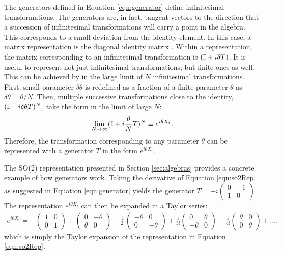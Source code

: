 The generators defined in Equation \ref{eqn:generator} define infinitesimal transformations.
The generators are, in fact, tangent vectors to the direction that a succession of infinitesimal transformations will carry a point in the algebra.
This corresponds to a small deviation from the identity element. In this case, a matrix representation is the diagonal identity matrix \ident.
Within a representation, the matrix corresponding to an infinitesimal transformation is $(\mathbb{I}+i\delta T)$.
It is useful to represent not just infinitesimal transformations, but finite ones as well.
This can be achieved by in the large limit of $N$ infinitesimal transformations.
First, small parameter $\delta\theta$ is redefined as a fraction of a finite parameter $\theta$ as $\delta\theta=\theta/N$.
Then, multiple successive transformations close to the identity, $(\mathbb{I}+i\delta\theta T)^N$, take the form in the limit of large $N$:
\begin{equation}\begin{split}
\lim_{N\to\infty}(\mathbb{I}+i\frac{\theta}{N}T)^N\equiv e^{i\theta X_i}. \\
\end{split}\end{equation}
Therefore, the transformation corresponding to any parameter $\theta$ can be represented with a generator $T$ in the form $e^{i\theta X_i}$.

The SO(2) representation presented in Section \ref{sec:algebras} provides a concrete example of how generators work.
Taking the derivative of Equation \ref{eqn:so2Rep} as suggested in Equation \ref{eqn:generator} yields the generator $T=-i\begin{pmatrix}0&-1\\1&0\end{pmatrix}$.
The representation $e^{i\theta X_i}$ can then be expanded in a Taylor series:
\begin{equation}\begin{split}
e^{i\theta X_i} = & 
            \begin{pmatrix}1&0\\0&1\end{pmatrix} +  %
            \begin{pmatrix}0&-\theta\\\theta&0\end{pmatrix} +  %
            \frac{1}{2!}\begin{pmatrix}-\theta&0\\0&-\theta\end{pmatrix} + %
            \frac{1}{3!}\begin{pmatrix}0&\theta\\-\theta&0\end{pmatrix} + %
            \frac{1}{4!}\begin{pmatrix}\theta&0\\0&\theta\end{pmatrix} + ..., %
\end{split}\end{equation}
which is simply the Taylor expansion of the representation in Equation \ref{eqn:so2Rep}.


